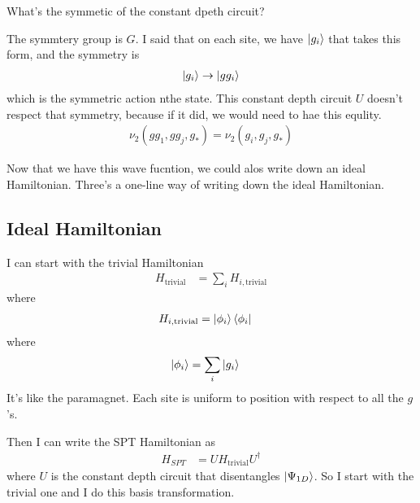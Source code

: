 \begin{question}
    What's the symmetic of the constant dpeth circuit?
\end{question}
The symmtery group is $G$.
I said that on each site,
we have $\ket{g_i}$ that takes this form,
and the symmetry is
\begin{align}
    \ket{g_i} \to \ket{ gg_i}
\end{align}
which is the symmetric action nthe state.
This constant depth circuit $U$ doesn't respect that symmetry,
because if it did,
we would need to hae this equlity.
\begin{align}
    \nu_2\left( gg_1, gg_j, g_* \right) =
    \nu_2\left( g_i, g_j, g_* \right)
\end{align}

Now that we have this wave fucntion,
we could alos write down an ideal Hamiltonian.
Three's a one-line way of writing down the ideal Hamiltonian.

\subsection{Ideal Hamiltonian}
I can start with the trivial Hamiltonian
\begin{align}
    H_{\text{trivial}} &=
    \sum_{i}
    H_{i,\text{trivial}}
\end{align}
where
\begin{align}
    H_{i,\text{trivial}}
    &=
    \ket{\phi_i}\bra{\phi_i}
\end{align}
where
\begin{align}
    \ket{\phi_i} &=
    \sum_{i} \ket{g_i}
\end{align}
It's like the paramagnet.
Each site is uniform to position with respect to all the $g$'s.

Then I can write the SPT Hamiltonian as
\begin{align}
    H_{SPT} &=
    U H_{\text{trivial}} U^\dagger
\end{align}
where $U$ is the constant depth circuit that disentangles 
$\ket{\Psi_{1D}}$.
So I start with the trivial one and I do this basis transformation.

